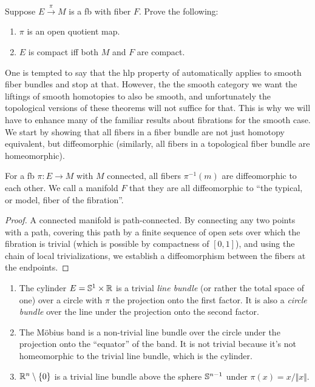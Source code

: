 \begin{xca}
    Suppose $E\overset{\pi}{\to}M$ is a \gls{fb} with fiber $F$. Prove the following:
    \begin{enumerate}[label=(\alph*)]
        \item $\pi$ is an open quotient map.
        \item $E$ is compact iff both $M$ and $F$ are compact.
    \end{enumerate}
\end{xca}


One is tempted to say that the \gls{hlp} property of automatically applies to smooth fiber bundles and stop at that.  However, the the smooth category we want the liftings of smooth homotopies to also be smooth, and unfortunately the topological versions of these theorems will not suffice for that. This is why we will have to enhance many of the familiar results about fibrations for the smooth case. We start by showing that all fibers in a fiber bundle are not just homotopy equivalent, but diffeomorphic (similarly, all fibers in a topological fiber bundle are homeomorphic).

\begin{prop}
    For a \gls{fb} $\pi:E\to M$ with $M$ connected, all fibers $\pi^{-1}(m)$ are diffeomorphic to each other. We call a manifold $F$ that they are all diffeomorphic to ``the typical, or model, fiber of the fibration''.
\end{prop}
\begin{proof}
    A connected manifold is path-connected. By connecting any two points with a path, covering this path by a finite sequence of open sets over which the fibration is trivial (which is possible by compactness of $[0,1]$), and using the chain of local trivializations, we establish a diffeomorphism between the fibers at the endpoints.
\end{proof}
\begin{example}
\begin{enumerate}
    \item The cylinder $E=\mathbb{S}^1\times\mathbb{R} $ is a trivial \emph{line bundle} (or rather the total space of one) over a circle with $\pi$ the projection onto the first factor. It is also a \emph{circle bundle} over the line under the projection onto the second factor.
    \item The M\"obius band is a non-trivial line bundle over the circle under the projection onto the ``equator'' of the band. It is not trivial because it's not homeomorphic to the trivial line bundle, which is the cylinder.
    \item $\mathbb{R}^n\setminus\{0\}$ is a trivial line bundle above the sphere $\mathbb{S}^{n-1}$ under $\pi(x)=x/\Vert x\Vert$.
\end{enumerate}
\end{example}


